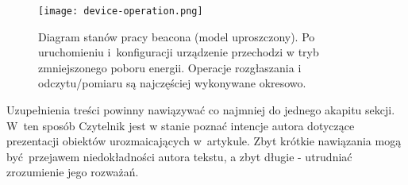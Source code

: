\begin{figure}
	\begin{center}
		\vspace{-5mm}
		\texttt{[image: device-operation.png]}
		\caption{
			Diagram stanów pracy beacona (model uproszczony). Po uruchomieniu i~konfiguracji urządzenie przechodzi w tryb zmniejszonego poboru energii. Operacje rozgłaszania i odczytu/pomiaru są najczęściej wykonywane okresowo.
		}
		\label{fig:devop}
		\vspace{-8mm}
	\end{center}
\end{figure}

Uzupełnienia treści powinny nawiązywać co najmniej do jednego akapitu sekcji. W~ten sposób Czytelnik jest w stanie poznać intencje autora dotyczące prezentacji obiektów urozmaicających w~artykule. Zbyt krótkie nawiązania mogą być przejawem niedokładności autora tekstu, a zbyt długie - utrudniać zrozumienie jego rozważań.
